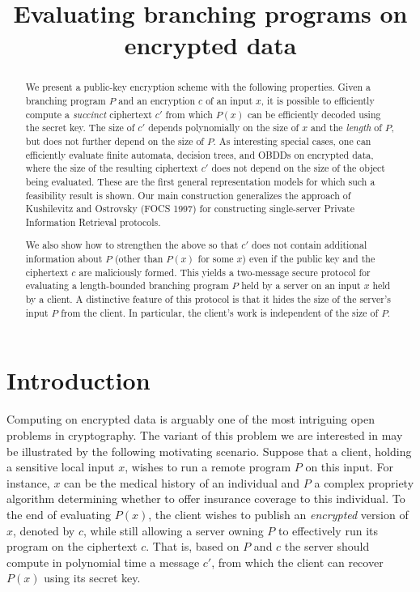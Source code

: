 \documentclass{article}
\title{Evaluating branching programs on encrypted data}\label{sec-eval-bp}
\begin{document}
\maketitle
	
\begin{abstract}
	
	We present a public-key encryption scheme with the following
	properties. Given a branching program $P$ and an encryption $c$ of
	an input $x$, it is possible to efficiently compute a {\em succinct}
	ciphertext $c'$ from which $P(x)$ can be efficiently decoded using
	the secret key. The size of $c'$ depends polynomially on the size of
	$x$ and the {\em length} of $P$, but does not further depend on the
	size of $P$. As interesting special cases, one can efficiently
	evaluate finite automata, decision trees, and OBDDs on encrypted
	data, where the size of the resulting ciphertext $c'$ does not
	depend on the size of the object being evaluated. These are the
	first general representation models for which such a feasibility
	result is shown. Our main construction generalizes the approach of
	Kushilevitz and Ostrovsky (FOCS 1997) for constructing single-server
	Private Information Retrieval protocols.
	
	We also show how to strengthen the above so that $c'$ does not
	contain additional information about $P$ (other than $P(x)$ for some
	$x$) even if the public key and the ciphertext $c$ are maliciously
	formed. This yields a two-message secure protocol for evaluating a
	length-bounded branching program $P$ held by a server on an input
	$x$ held by a client. A distinctive feature of this protocol is that
	it hides the size of the server's input $P$ from the client. In
	particular, the client's work is independent of the size of $P$.
	
	
\end{abstract}

\section{Introduction}
Computing on encrypted data is arguably one of the most intriguing
open problems in cryptography. The variant of this problem we are
interested in may be illustrated by the following motivating
scenario. Suppose that a client, holding a sensitive local input
$x$, wishes to run a remote program $P$ on this input. For
instance, $x$ can be the medical history of an individual and $P$ a
complex propriety algorithm determining whether to offer insurance
coverage to this individual. To the end of evaluating $P(x)$, the
client wishes to publish an {\em encrypted} version of $x$, denoted
by $c$, while still allowing a server owning $P$ to effectively run
its program on the ciphertext $c$. That is, based on $P$ and $c$
the server should compute in polynomial time a message $c'$, from
which the client can recover $P(x)$ using its secret key.
\end{document}
